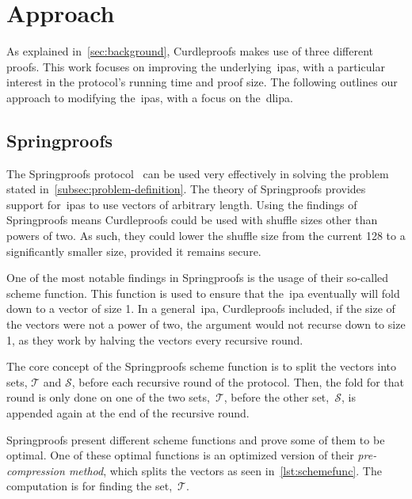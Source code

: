 \section{Approach}\label{sec:approach}
As explained in~\autoref{sec:background}, Curdleproofs makes use of three different proofs.
This work focuses on improving the underlying~\glspl{ipa}, with a particular interest in the protocol's running time and proof size.
The following outlines our approach to modifying the~\glspl{ipa}, with a focus on the~\gls{dlipa}.

\subsection{Springproofs}\label{sec:approach-springproofs}
The Springproofs protocol~\cite{zhang2024springproofs} can be used very effectively in solving the problem stated in~\autoref{subsec:problem-definition}.
The theory of Springproofs provides support for~\glspl{ipa} to use vectors of arbitrary length.
Using the findings of Springproofs means Curdleproofs could be used with shuffle sizes other than powers of two.
As such, they could lower the shuffle size from the current 128 to a significantly smaller size, provided it remains secure.

One of the most notable findings in Springproofs is the usage of their so-called scheme function.
This function is used to ensure that the~\gls{ipa} eventually will fold down to a vector of size 1.
In a general~\gls{ipa}, Curdleproofs included, if the size of the vectors were not a power of two, the argument would not recurse down to size 1, as they work by halving the vectors every recursive round.


The core concept of the Springproofs scheme function is to split the vectors into sets, $\mathbf{\mathcal{T}}$ and $\mathbf{\mathcal{S}}$, before each recursive round of the protocol.
Then, the fold for that round is only done on one of the two sets,~$\mathbf{\mathcal{T}}$, before the other set,~$\mathbf{\mathcal{S}}$, is appended again at the end of the recursive round.

Springproofs present different scheme functions and prove some of them to be optimal.
One of these optimal functions is an optimized version of their \textit{pre-compression method}, which splits the vectors as seen in~\autoref{lst:schemefunc}.
The computation is for finding the set,~$\mathbf{\mathcal{T}}$.

